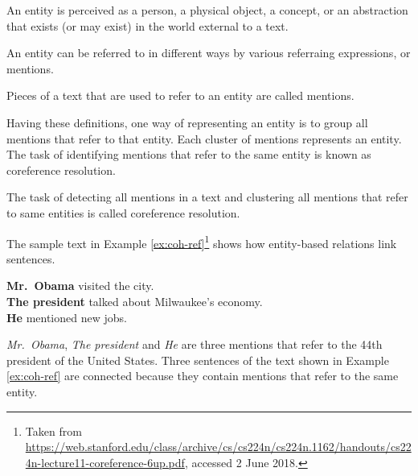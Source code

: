 \begin{definition}
    An entity is perceived as a person, a physical object, a concept, or an abstraction that exists (or may exist) in the world external to a text.  
\end{definition}

An entity can be referred to in different ways by various referraing expressions, or mentions. 

\begin{definition}
	Pieces of a text that are used to refer to an entity are called mentions. 
\end{definition}

Having these definitions, one way of representing an entity is to group all mentions that refer to that entity. 
Each cluster of mentions 
represents an entity. 
The task of identifying mentions that refer to the same entity is known as coreference resolution.   

\begin{definition}
	The task of detecting all mentions in a text and clustering all mentions that refer to same entities is called coreference resolution. 
\end{definition}

 
The sample text in Example \ref{ex:coh-ref}\footnote{Taken from \url{https://web.stanford.edu/class/archive/cs/cs224n/cs224n.1162/handouts/cs224n-lecture11-coreference-6up.pdf}, accessed 2 June 2018.} shows how entity-based relations link sentences. 

\begin{examples}
	\label{ex:coh-ref}
	\textbf{Mr.\ Obama} visited the city. \\
	\textbf{The president} talked about Milwaukee’s economy. \\
	\textbf{He} mentioned new jobs. \\
\end{examples} 

\emph{Mr.\ Obama}, \emph{The president} and \emph{He} are three mentions that refer to the 44th president of the United States. 
Three sentences of the text shown in Example \ref{ex:coh-ref} are connected because they contain mentions that refer to the same entity. 

